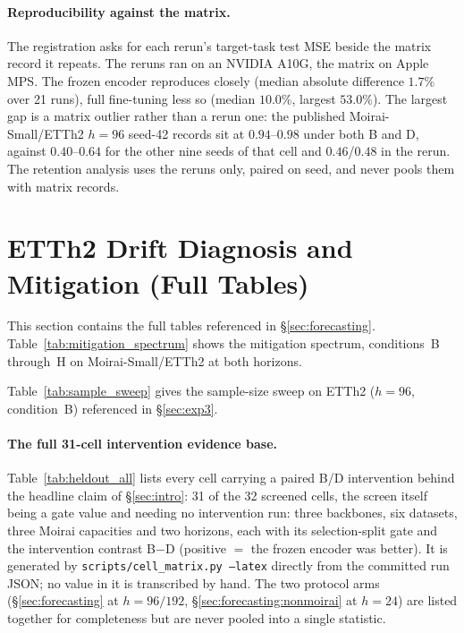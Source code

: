 \paragraph{Reproducibility against the matrix.}  The registration asks for each
rerun's target-task test MSE beside the matrix record it repeats.  The reruns ran
on an NVIDIA A10G, the matrix on Apple MPS.  The frozen encoder reproduces closely
(median absolute difference $1.7\%$ over 21 runs), full fine-tuning less so
(median $10.0\%$, largest $53.0\%$).  The largest gap is a matrix outlier rather than a
rerun one: the published Moirai-Small/ETTh2 $h{=}96$ seed-42 records sit at
$0.94$--$0.98$ under both B and D, against $0.40$--$0.64$ for the other nine seeds of that
cell and $0.46$/$0.48$ in the rerun.  The retention analysis uses the reruns only,
paired on seed, and never pools them with matrix records.

\section{ETTh2 Drift Diagnosis and Mitigation (Full Tables)}
\label{app:full_tables}

This section contains the full tables referenced in \S\ref{sec:forecasting}.
Table~\ref{tab:mitigation_spectrum} shows the mitigation spectrum, conditions~B
through~H on Moirai-Small/ETTh2 at both horizons.



Table~\ref{tab:sample_sweep} gives the sample-size sweep on ETTh2
($h{=}96$, condition~B) referenced in \S\ref{sec:exp3}.



\paragraph{The full 31-cell intervention evidence base.}
Table~\ref{tab:heldout_all} lists every cell carrying a paired B/D
intervention behind the headline claim of \S\ref{sec:intro}: 31 of the 32
screened cells, the screen itself being a gate value and needing no
intervention run: three backbones, six datasets, three Moirai capacities and
two horizons, each with its selection-split gate and the intervention contrast
B$-$D (positive ${=}$ the frozen encoder was better). It is generated by
\texttt{scripts/cell\_matrix.py --latex} directly from the committed run
JSON; no value in it is transcribed by hand. The two protocol arms
(\S\ref{sec:forecasting} at $h{=}96/192$, \S\ref{sec:forecasting:nonmoirai}
at $h{=}24$) are listed together for completeness but are never pooled into a
single statistic.

